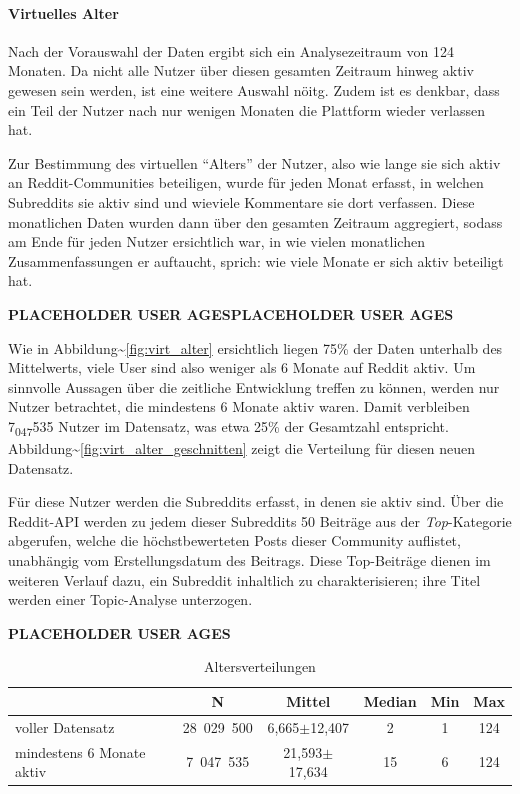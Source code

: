 \documentclass[11pt,a4paper,twoside]{article}
\let\oldparagraph\paragraph
\renewcommand{\paragraph}[1]{\oldparagraph{#1}\mbox{}}
\begin{document}
\hypertarget{virtage}{%
\paragraph{Virtuelles Alter}\label{virtage}}

Nach der Vorauswahl der Daten ergibt sich ein Analysezeitraum von 124
Monaten. Da nicht alle Nutzer über diesen gesamten Zeitraum hinweg aktiv
gewesen sein werden, ist eine weitere Auswahl nöitg. Zudem ist es
denkbar, dass ein Teil der Nutzer nach nur wenigen Monaten die Plattform
wieder verlassen hat.

Zur Bestimmung des virtuellen \enquote{Alters} der Nutzer, also wie
lange sie sich aktiv an Reddit-Communities beteiligen, wurde für jeden
Monat erfasst, in welchen Subreddits sie aktiv sind und wieviele
Kommentare sie dort verfassen. Diese monatlichen Daten wurden dann über
den gesamten Zeitraum aggregiert, sodass am Ende für jeden Nutzer
ersichtlich war, in wie vielen monatlichen Zusammenfassungen er
auftaucht, sprich: wie viele Monate er sich aktiv beteiligt hat.

\textbf{PLACEHOLDER USER AGESPLACEHOLDER USER AGES}

Wie in Abbildung\textasciitilde{}\ref{fig:virt_alter} ersichtlich liegen
75\% der Daten unterhalb des Mittelwerts, viele User sind also weniger
als 6 Monate auf Reddit aktiv. Um sinnvolle Aussagen über die zeitliche
Entwicklung treffen zu können, werden nur Nutzer betrachtet, die
mindestens 6 Monate aktiv waren. Damit verbleiben
7\textsubscript{047}535 Nutzer im Datensatz, was etwa 25\% der
Gesamtzahl entspricht.
Abbildung\textasciitilde{}\ref{fig:virt_alter_geschnitten} zeigt die
Verteilung für diesen neuen Datensatz.

Für diese Nutzer werden die Subreddits erfasst, in denen sie aktiv sind.
Über die Reddit-API werden zu jedem dieser Subreddits 50 Beiträge aus
der \textit{Top}-Kategorie abgerufen, welche die höchstbewerteten Posts
dieser Community auflistet, unabhängig vom Erstellungsdatum des
Beitrags. Diese Top-Beiträge dienen im weiteren Verlauf dazu, ein
Subreddit inhaltlich zu charakterisieren; ihre Titel werden einer
Topic-Analyse unterzogen.

\textbf{PLACEHOLDER USER AGES}

\begin{table}[h]
    \centering
    \begin{tabular}{lccccc}
        \toprule
        & N & Mittel & Median & Min & Max \\
        \midrule
        voller Datensatz & 28~029~500 & 6,665$\pm$12,407 & 2 & 1 & 124 \\
        mindestens 6 Monate aktiv & 7~047~535 & 21,593$\pm$17,634 & 15 & 6 & 124 \\
        \bottomrule
    \end{tabular}
    \caption{Altersverteilungen}%
    \label{tab:altersverteilungen}
\end{table}
\end{document}
